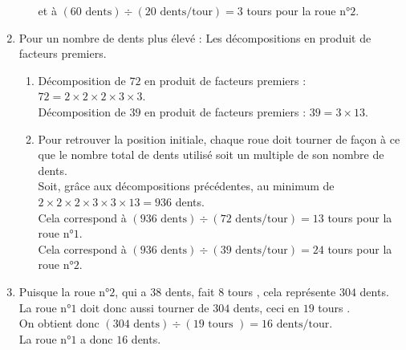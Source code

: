 \begin{enumerate}
\begin{enumerate}
                    et à $(60\text{ dents})\div (20\text{ dents/tour}) = 3$ tours pour la roue n°$2$.
                \end{enumerate}
            \setcounter{enumi}{1}
            \item Pour un nombre de dents plus élevé : Les décompositions en produit de facteurs premiers.\\
                \begin{enumerate}
                    \item Décomposition de $72$ en produit de facteurs premiers :  $72 = 2\times2\times2\times3\times3$.\\
                    Décomposition de $39$ en produit de facteurs premiers :  $39 = 3\times13$.
                \medskip
                    \item Pour retrouver la position initiale,
                    chaque roue doit tourner de façon à ce que le nombre total de dents utilisé soit un multiple de son nombre
                    de dents.\\
                    Soit, grâce aux décompositions précédentes, au minimum de $2\times2\times2\times3\times3\times13 = 936$ dents.\\
                    Cela correspond à $(936\text{ dents})\div (72\text{ dents/tour}) = 13$ tours pour la roue n°$1$.\\
                    Cela correspond à $(936\text{ dents})\div (39\text{ dents/tour}) = 24$ tours pour la roue n°$2$.
                \end{enumerate}
            \setcounter{enumi}{2}
            \item Puisque la roue n°$2$, qui a $38$ dents, fait $8$  tours , cela représente $304$ dents.\\
            La roue n°$1$ doit donc aussi tourner de $304$ dents, ceci en $19$  tours .\\
            On obtient donc $(304\text{ dents})\div (19\text{ tours }) = 16 \text{ dents/tour}.$\\
            La roue n°$1$ a donc $16$ dents.
        \end{enumerate}
